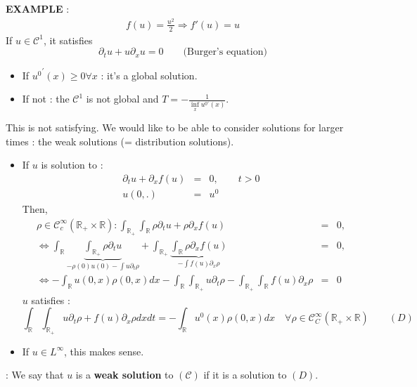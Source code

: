 \documentclass{report}
\newcommand*{\definition}[1]{\noindent\textbf{\color{cadmiumgreen}{#1}}}
\theoremstyle{plain}
\theoremstyle{definition}
\theoremstyle{remark}
\begin{document}
    \textbf{EXAMPLE} : 
    \begin{eqnarray*}
    f(u) = \frac{u^2}{2} \Rightarrow f'(u) = u 
    \end{eqnarray*}
    If $u\in \mathcal{C}^1$, it satisfies \begin{equation*}
        \partial_t u + u \partial_x u = 0 \qquad \text{(Burger's equation)}
    \end{equation*}
    \begin{itemize}
        \item If ${u^0}^\prime(x) \ge 0 \forall x$ : it's a global solution.
        \item If not : the $\mathcal{C}^1$ is not global and $T = -\frac{1}{\inf\limits_x u^{0\prime}(x)}$.
    \end{itemize}
    This is not satisfying. We would like to be able to consider solutions for larger times : the weak solutions (= distribution solutions).
    \begin{itemize}
        \item If $u$ is solution to : \begin{eqnarray*}
        \partial_t u + \partial_x f(u) &=& 0, \qquad t>0 \\
        u(0,.) &=& u^0
        \end{eqnarray*}
        Then, \begin{eqnarray*}
        \rho \in \mathcal{C}_c^\infty(\mathbb{R}_+ \times \mathbb{R}) : \int_{\mathbb{R}_+}\int_{\mathbb{R}}\rho \partial_t u + \rho \partial_x f(u) &=& 0, \\
        \Leftrightarrow \int_{\mathbb{R}}\underbrace{\int_{\mathbb{R}_+}\rho \partial_t u}_{-\rho(0)u(0) - \int u \partial_t \rho} + \int_{\mathbb{R}_+}\underbrace{\int_{\mathbb{R}}\rho \partial_x f(u)}_{-\int f(u) \partial_x \rho} &=& 0, \\
        \Leftrightarrow - \int_{\mathbb{R}}u(0,x)\rho(0,x)dx - \int_{\mathbb{R}}\int_{\mathbb{R}_+} u\partial_t \rho - \int_{\mathbb{R}_+}\int_{\mathbb{R}} f(u) \partial_x \rho &=& 0 
        \end{eqnarray*}
        $u$ satisfies : 
        $$ \int_{\mathbb{R}}\int_{\mathbb{R}_+} u\partial_t \rho + f(u) \partial_x \rho dx dt = - \int_{\mathbb{R}} u^0(x) \rho(0,x) dx \quad \forall \rho \in \mathcal{C}^\infty_C(\mathbb{R}_+ \times \mathbb{R}) \qquad (D)$$
        \item If $u \in L^\infty$, this makes sense. 
    \end{itemize}
    \definition{Weak Solution} : We say that $u$ is a \textbf{weak solution} to $(\mathcal{C})$ if it is a solution to $(D)$. \\
\end{document}
